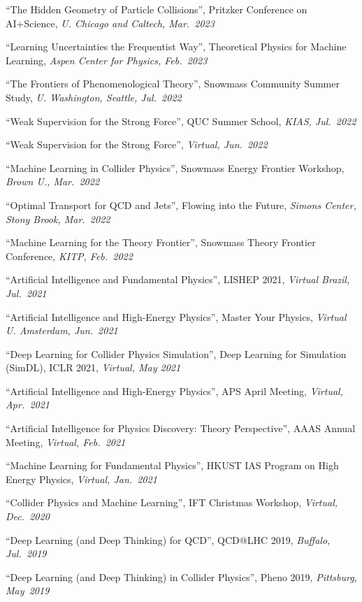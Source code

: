 \documentclass[11pt]{article}
\begin{document}
\item ``The Hidden Geometry of Particle Collisions'', Pritzker Conference on AI+Science, \textit{U. Chicago and Caltech, Mar.~2023}
\item ``Learning Uncertainties the Frequentist Way'', Theoretical Physics for Machine Learning, \textit{Aspen Center for Physics, Feb.~2023}
\item ``The Frontiers of Phenomenological Theory'',  Snowmass Community Summer Study, \textit{U. Washington, Seattle, Jul.~2022}
\item ``Weak Supervision for the Strong Force'',  QUC Summer School, \textit{KIAS, Jul.~2022}
\item ``Weak Supervision for the Strong Force'', \textit{Virtual, Jun.~2022}
\item ``Machine Learning in Collider Physics'', Snowmass Energy Frontier Workshop, \textit{Brown U., Mar.~2022}
\item ``Optimal Transport for QCD and Jets'', Flowing into the Future, \textit{Simons Center, Stony Brook, Mar.~2022}
\item ``Machine Learning for the Theory Frontier'', Snowmass Theory Frontier Conference, \textit{KITP, Feb.~2022}
\item ``Artificial Intelligence and Fundamental Physics'', LISHEP 2021, \textit{Virtual Brazil, Jul.~2021}
\item ``Artificial Intelligence and High-Energy Physics'', Master Your Physics, \textit{Virtual U. Amsterdam, Jun.~2021}
\item ``Deep Learning for Collider Physics Simulation'', Deep Learning for Simulation (SimDL), ICLR 2021, \textit{Virtual, May 2021}
\item ``Artificial Intelligence and High-Energy Physics'', APS April Meeting, \textit{Virtual, Apr.~2021}
\item ``Artificial Intelligence for Physics Discovery: Theory Perspective'', AAAS Annual Meeting, \textit{Virtual, Feb.~2021}
\item ``Machine Learning for Fundamental Physics'', HKUST IAS Program on High Energy Physics, \textit{Virtual, Jan.~2021}
\item ``Collider Physics and Machine Learning'', IFT Christmas Workshop, \textit{Virtual, Dec.~2020}
\item ``Deep Learning (and Deep Thinking) for QCD'', QCD@LHC 2019, \textit{Buffalo, Jul.~2019}
\item ``Deep Learning (and Deep Thinking) in Collider Physics'', Pheno 2019, \textit{Pittsburg, May~2019}
\end{document}
